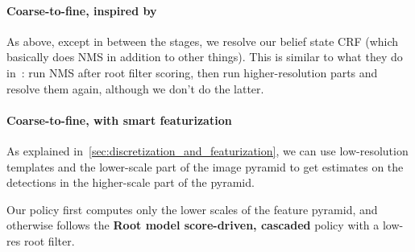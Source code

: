 \paragraph{Coarse-to-fine, inspired by~\cite{Pedersoli2011}}
As above, except in between the stages, we resolve our belief state CRF (which basically does NMS in addition to other things).
This is similar to what they do in~\cite{Pedersoli2011}: run NMS after root filter scoring, then run higher-resolution parts and resolve them again, although we don't do the latter.

\paragraph{Coarse-to-fine, with smart featurization}
As explained in~\autoref{sec:discretization_and_featurization}, we can use low-resolution templates and the lower-scale part of the image pyramid to get estimates on the detections in the higher-scale part of the pyramid.

Our policy first computes only the lower scales of the feature pyramid, and otherwise follows the \textbf{Root model score-driven, cascaded} policy with a low-res root filter.
